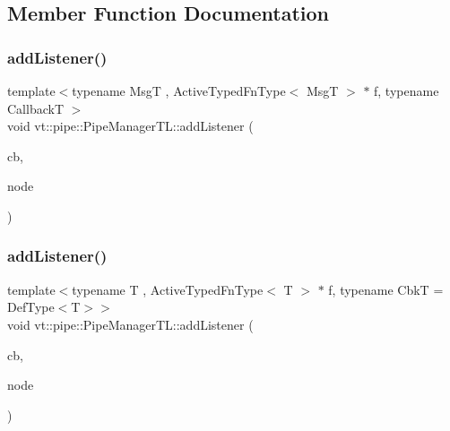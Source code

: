 \subsection{Member Function Documentation}
\mbox{\label{structvt_1_1pipe_1_1_pipe_manager_t_l_ae1aee468ba813cc359e3d3602722b161}} 
\subsubsection{\texorpdfstring{add\+Listener()}{addListener()}\hspace{0.1cm}{\footnotesize\ttfamily [1/2]}}
{\footnotesize\ttfamily template$<$typename MsgT , Active\+Typed\+Fn\+Type$<$ Msg\+T $>$ $\ast$ f, typename CallbackT $>$ \\
void vt\+::pipe\+::\+Pipe\+Manager\+T\+L\+::add\+Listener (\begin{DoxyParamCaption}\item[{CallbackT const \&}]{cb,  }\item[{\hyperlink{namespacevt_a866da9d0efc19c0a1ce79e9e492f47e2}{Node\+Type} const \&}]{node }\end{DoxyParamCaption})}

\mbox{\label{structvt_1_1pipe_1_1_pipe_manager_t_l_a379d983dfbf654ed01281d96148175f3}} 
\subsubsection{\texorpdfstring{add\+Listener()}{addListener()}\hspace{0.1cm}{\footnotesize\ttfamily [2/2]}}
{\footnotesize\ttfamily template$<$typename T , Active\+Typed\+Fn\+Type$<$ T $>$ $\ast$ f, typename CbkT  = Def\+Type$<$\+T$>$$>$ \\
void vt\+::pipe\+::\+Pipe\+Manager\+T\+L\+::add\+Listener (\begin{DoxyParamCaption}\item[{CbkT const \&}]{cb,  }\item[{\hyperlink{namespacevt_a866da9d0efc19c0a1ce79e9e492f47e2}{Node\+Type} const \&}]{node }\end{DoxyParamCaption})}

